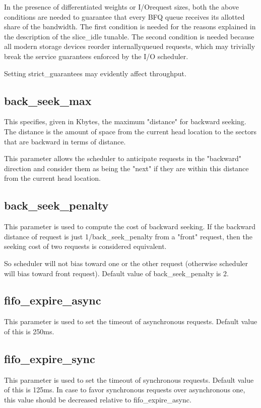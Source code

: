 \documentclass[a4paper,11pt,english]{sphinxmanual}
\begin{document}
In the presence of differentiated weights or I/O\sphinxhyphen{}request sizes, both
the above conditions are needed to guarantee that every BFQ queue
receives its allotted share of the bandwidth. The first condition is
needed for the reasons explained in the description of the slice\_idle
tunable.  The second condition is needed because all modern storage
devices reorder internally\sphinxhyphen{}queued requests, which may trivially break
the service guarantees enforced by the I/O scheduler.

Setting strict\_guarantees may evidently affect throughput.


\subsection{back\_seek\_max}
\label{\detokenize{bfq-iosched:back-seek-max}}
This specifies, given in Kbytes, the maximum "distance" for backward seeking.
The distance is the amount of space from the current head location to the
sectors that are backward in terms of distance.

This parameter allows the scheduler to anticipate requests in the "backward"
direction and consider them as being the "next" if they are within this
distance from the current head location.


\subsection{back\_seek\_penalty}
\label{\detokenize{bfq-iosched:back-seek-penalty}}
This parameter is used to compute the cost of backward seeking. If the
backward distance of request is just 1/back\_seek\_penalty from a "front"
request, then the seeking cost of two requests is considered equivalent.

So scheduler will not bias toward one or the other request (otherwise scheduler
will bias toward front request). Default value of back\_seek\_penalty is 2.


\subsection{fifo\_expire\_async}
\label{\detokenize{bfq-iosched:fifo-expire-async}}
This parameter is used to set the timeout of asynchronous requests. Default
value of this is 250ms.


\subsection{fifo\_expire\_sync}
\label{\detokenize{bfq-iosched:fifo-expire-sync}}
This parameter is used to set the timeout of synchronous requests. Default
value of this is 125ms. In case to favor synchronous requests over asynchronous
one, this value should be decreased relative to fifo\_expire\_async.
\end{document}
